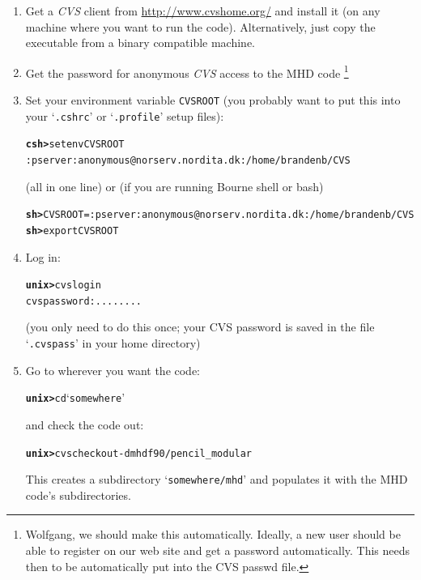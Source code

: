 \documentclass[12pt,twoside,notitlepage,a4paper]{article}
\makeatletter
\newcommand{\prompt}[1]{{\ttfamily\bfseries{}#1}}
\newcommand{\code}[1]{\texttt{#1}}
\newcommand{\env}[1]{\code{#1}\index{#1@\emph{#1}}}
\newcommand{\file}[1]{`\texttt{#1}'}
\newcommand{\name}[1]{\textsl{#1}\index{#1}\/}
\newcommand{\bcks}{\texttt{\symbol{92}}}
\newcommand{\bs}{\bcks}       %
\makeatother
\begin{document}
\begin{enumerate}

\item Get a \name{CVS} client from \url{http://www.cvshome.org/} and
  install it (on any machine where you want to run the code).
  Alternatively, just copy the executable from a binary compatible
  machine.

\item Get the password for anonymous \name{CVS} access to the MHD code
\footnote{Wolfgang, we should make this automatically. Ideally, a new user
should be able to register on our web site and get a password automatically.
This needs then to be automatically put into the CVS passwd file.}

\item Set your environment variable \env{CVSROOT} (you probably want to
  put this into your \file{.cshrc} or \file{.profile} setup files):
  \begin{alltt}
  \prompt{csh> } setenv CVSROOT \bs
          :pserver:anonymous@norserv.nordita.dk:/home/brandenb/CVS \
  \end{alltt}
  (all in one line) or (if you are running Bourne shell or bash)
  \begin{alltt}
  \prompt{sh> } CVSROOT=:pserver:anonymous@norserv.nordita.dk:/home/brandenb/CVS
  \prompt{sh> } export CVSROOT \
  \end{alltt}

\item Log in:
  \begin{alltt}
  \prompt{unix> } cvs login
  cvs password: ........ \
\end{alltt}
(you only need to do this once; your CVS password is saved in the file
\file{.cvspass} in your home directory)

\item Go to wherever you want the code:
  \begin{alltt}
  \prompt{unix> } cd \file{somewhere} \
  \end{alltt}
  and check the code out:
  \begin{alltt}
  \prompt{unix> } cvs checkout -d mhd f90/pencil_modular \
  \end{alltt} 
  This creates a subdirectory \file{somewhere/mhd} and populates it with
  the MHD code's subdirectories.

\end{enumerate}


\end{document}

